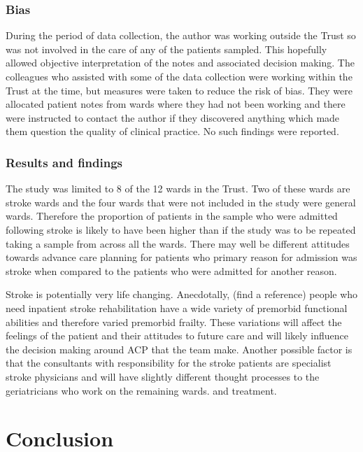 \documentclass
[
	12pt,
	a4paper,
	oneside,
]{report}
\begin{document}
\subsection{Bias} 
During the period of data collection, the author was working outside the Trust 
so was not involved in the care of any of the patients sampled. This hopefully 
allowed objective interpretation of the notes and associated decision making.
The colleagues who assisted with some of the data collection were working 
within the Trust at the time, but measures were taken to reduce the risk of 
bias. They were allocated patient notes from wards where they had not been
working and there were instructed to contact the author if they discovered
anything which made them question the quality of clinical practice. No such
findings were reported.

\subsection{Results and findings}

The study was limited to 8 of the 12 wards in the Trust. Two of these wards
are stroke wards and the four wards that were not included in the study were 
general wards. Therefore the proportion of patients in the sample
who were admitted following stroke is likely to have been higher than if the 
study was to be repeated taking a sample from across all the wards. There may 
well be different attitudes towards advance care planning for patients who 
primary reason for admission was stroke when compared to the patients who
were admitted for another reason.

Stroke is potentially very life changing. Anecdotally, (find a reference) 
people who need
inpatient stroke rehabilitation have a wide variety of premorbid functional 
abilities and therefore varied premorbid frailty. These variations will
affect the feelings of the patient and their attitudes to future care and will
likely influence the decision making around ACP that the team make. Another
possible factor is that the consultants with responsibility for the stroke 
patients are specialist stroke physicians and will have slightly different 
thought processes to the geriatricians who work on the remaining wards.
and treatment.

\chapter{Conclusion}
\end{document}
